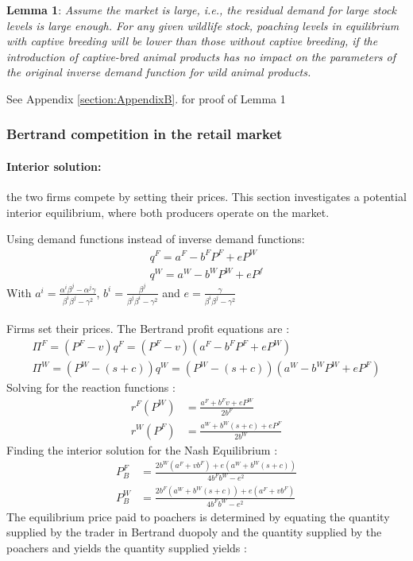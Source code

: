 \begin{displayquote}
    \textbf{Lemma 1}:  \textit{Assume the market is large, i.e., the residual demand for large stock levels is large enough. For any given wildlife stock, poaching levels in equilibrium with captive breeding will be lower than those without captive breeding, if the introduction of captive-bred animal products has no impact on the parameters of the original inverse demand function for wild animal products.}
\end{displayquote}
See Appendix \ref{section:AppendixB}. for proof of Lemma 1

\subsubsection{Bertrand competition in the retail market}
\paragraph{Interior solution:} the two firms compete by setting their prices. This section investigates a potential interior equilibrium, where both producers operate on the market. 

Using demand functions instead of inverse demand functions: 
\begin{align*}
    q^F = a^F - b^FP^F + e P^W\\
    q^W = a^W - b^WP^W + e P^f
\end{align*}
With $a^i = \frac{\alpha^i \beta^j - \alpha^j \gamma}{\beta^i\beta^j - \gamma^2}$, $b^i = \frac{\beta^j}{\beta^j \beta^i - \gamma^2}$ and $e=\frac{\gamma}{\beta^i \beta^j - \gamma^2}$
\\\\
Firms set their prices. The Bertrand profit equations are : 
\begin{align*}
    \Pi^F = (P^F - v)q^F = (P^F - v)(a^F - b^F P^F + e P^W)\\
    \Pi^W = (P^W - (s+c))q^W = (P^W - (s+c))(a^W - b^W P^W + e P^F)
\end{align*}
Solving for the reaction functions : 
\begin{align}
    r^F(P^W) &= \frac{a^F + b^F v + e P^W}{2b^F}\\
    r^W(P^F) &= \frac{a^W + b^W(s+c) + e P^F}{2b^W}
\label{eq:rf_bertrand}
\end{align}
Finding the interior solution for the Nash Equilibrium :
\begin{align*}
    P^F_B &= \frac{2b^W(a^F + vb^F) + e(a^W + b^W(s+c))}{4b^Fb^W - e^2}\\
    P^W_B &= \frac{2b^F(a^W+ b^W(s+c)) + e(a^F + vb^F)}{4b^Fb^W - e^2}
\end{align*}
The equilibrium price paid to poachers is determined by equating the quantity supplied by the trader in Bertrand duopoly and the quantity supplied by the poachers and yields the quantity supplied yields : \\

